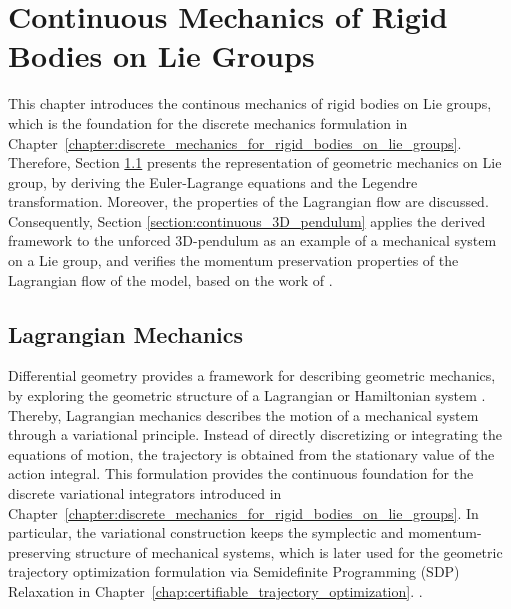 \chapter{Continuous Mechanics of Rigid Bodies on Lie Groups}
\label{chapter:continous_mechanics_of_rigid_bodies_on_lie_groups}


This chapter introduces the continous mechanics of rigid bodies on Lie groups, which is the foundation for the discrete mechanics formulation in Chapter~\ref{chapter:discrete_mechanics_for_rigid_bodies_on_lie_groups}. 
Therefore, Section \ref{sec:continuous_lagrangian_mechanics} presents the representation of geometric mechanics on Lie group,
by deriving the Euler-Lagrange equations and the Legendre transformation. Moreover, the properties of the Lagrangian flow are discussed. Consequently, 
Section \ref{section:continuous_3D_pendulum} applies the derived framework to the unforced 3D-pendulum as an example of a mechanical system on a Lie group, and verifies the momentum preservation properties of the Lagrangian 
flow of the model, based on the work of \cite{Lee2008}. 


\section{Lagrangian Mechanics}
\label{sec:continuous_lagrangian_mechanics}

Differential geometry provides a framework for describing geometric mechanics, by
exploring the geometric structure of a Lagrangian or Hamiltonian system \cite{Lee2008}.
Thereby, Lagrangian mechanics describes the motion of a mechanical system through
a variational principle. Instead of directly discretizing or integrating
the equations of motion, the trajectory is obtained from the stationary
value of the action integral. This formulation provides the continuous 
foundation for the discrete variational integrators introduced in 
Chapter~\ref{chapter:discrete_mechanics_for_rigid_bodies_on_lie_groups}. 
In particular, the variational construction keeps the symplectic and 
momentum-preserving structure of mechanical systems, which is later used 
for the geometric trajectory optimization formulation via Semidefinite Programming (SDP) Relaxation in Chapter~\ref{chap:certifiable_trajectory_optimization}.
\cite{Lee2008,Marsden2001,Sangli2025}.

